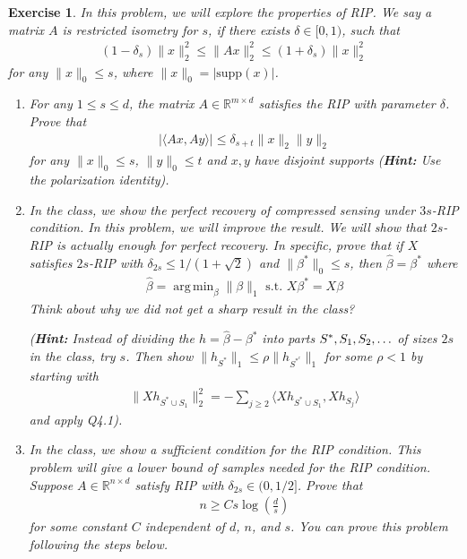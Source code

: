 \documentclass[12pt]{article}
\DeclareMathOperator*{\argmin}{arg\,min}
\theoremstyle{colon}
\newtheorem{exercise}{Exercise}
\begin{document}
\begin{exercise}
  In this problem, we will explore the properties of RIP. We say a matrix $A$ is restricted isometry for $s$, if there exists $\delta \in [0,1)$, such that
  \begin{gather*}
    (1-\delta_s) \lVert x \rVert_2^2 \leq \lVert A x \rVert_2^2 \leq (1+\delta_s) \lVert x \rVert_2^2
  \end{gather*}
  for any $\lVert x \rVert_0 \leq s$, where $\lVert x \rVert_0 = \lvert \text{supp}(x)\rvert$.
  \begin{enumerate}[label=\arabic*)]
    \item For any $1 \leq s \leq d$, the matrix $A \in \mathbb{R}^{m \times d}$ satisfies the RIP with parameter $\delta$. Prove that
      \begin{gather*}
        \lvert \langle Ax, Ay \rangle \rvert \leq \delta_{s+t} \lVert x \rVert_2 \lVert y \rVert_2
      \end{gather*}
      for any $\lVert x \rVert_0 \leq s$, $\lVert y \rVert_0 \leq t$ and $x,y$ have disjoint supports (\textbf{Hint:} Use the polarization identity).

    \item In the class, we show the perfect recovery of compressed sensing under $3s$-RIP condition. In this problem, we will improve the result. We will show that $2s$-RIP is actually enough for perfect recovery. In specific, prove that if $X$ satisfies $2s$-RIP with $\delta_{2s} \leq 1/(1+\sqrt{2})$ and $\lVert \beta^* \rVert_0 \leq s$, then $\hat{\beta} = \beta^*$ where
      \begin{gather*}
        \hat{\beta} = \argmin_{\beta} \lVert \beta \rVert_1 \text{ s.t. } X \beta^* = X \beta
      \end{gather*}
      Think about why we did not get a sharp result in the class?

      (\textbf{Hint:} Instead of dividing the $h = \hat{\beta} - \beta^*$ into parts $S^*, S_1, S_2, \mathellipsis$ of sizes $2s$ in the class, try $s$. Then show $\lVert h_{S^*} \rVert_1 \leq \rho \lVert h_{S^{*^c}} \rVert_1$ for some $\rho < 1$ by starting with
      \begin{gather*}
        \lVert X h_{S^* \cup S_1} \rVert_2^2 = - \sum_{j \geq 2} \langle X h_{S^* \cup S_1}, X h_{S_j} \rangle
      \end{gather*}
      and apply Q4.1).

    \item In the class, we show a sufficient condition for the RIP condition. This problem will give a lower bound of samples needed for the RIP condition. Suppose $A \in \mathbb{R}^{n \times d}$ satisfy RIP with $\delta_{2s} \in (0,1/2]$. Prove that
      \begin{gather*}
        n \geq C s \log \left( \frac{d}{s} \right)
      \end{gather*}
      for some constant $C$ independent of $d$, $n$, and $s$. You can prove this problem following the steps below.


\end{enumerate}
\end{exercise}
\end{document}
